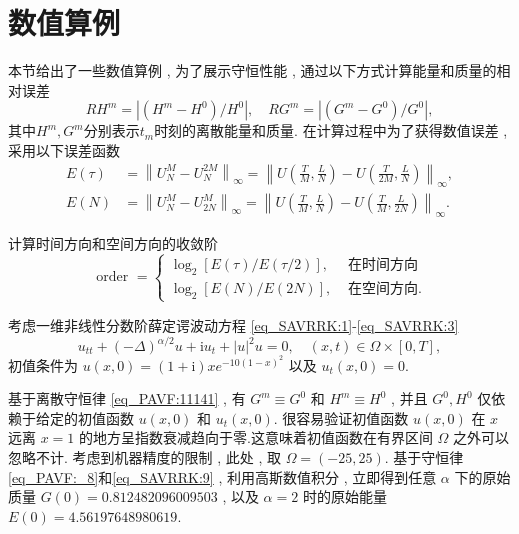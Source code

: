 \section{数值算例}\label{Section_PAVF: 4}

本节给出了一些数值算例 , 为了展示守恒性能 , 通过以下方式计算能量和质量的相对误差
\begin{equation}\label{eq_PAVF:105}
R H^{m}=\left|\left(H^{m}-H^{0}\right) / H^{0}\right| , \quad R G^{m}=\left|\left(G^{m}-G^{0}\right) / G^{0}\right| , 
\end{equation}
其中$H^{m} , G^{m}$分别表示$t_{m}$时刻的离散能量和质量.
在计算过程中为了获得数值误差 , 采用以下误差函数
\begin{align}\label{eq_PAVF:103}
E(\tau)&=\left\|U_{N}^{M}-U_{N}^{2 M}\right\|_{\infty}=\left\|U\left(\frac{T}{M} , \frac{L}{N}\right)-U\left(\frac{T}{2 M} , \frac{L}{N}\right)\right\|_{\infty} , \nonumber\\
E(N)&=\left\|U_{N}^{M}-U_{2 N}^{M}\right\|_{\infty}=\left\|U\left(\frac{T}{M} , \frac{L}{N}\right)-U\left(\frac{T}{M} , \frac{L}{2 N}\right)\right\|_{\infty}.
\end{align}

计算时间方向和空间方向的收敛阶
\begin{equation}
\text { order }= \left\{
\begin{aligned}
\log _{2}[E(\tau) / E(\tau / 2)] , & \text { 在时间方向 } \\
\log _{2}[E(N) / E(2 N)] , & \text { 在空间方向.}
\end{aligned}\right.\label{eq_PAVF:104}
\end{equation}
\begin{example}\label{exp_PAVF:2}
	考虑一维非线性分数阶薛定谔波动方程 \eqref{eq_SAVRRK:1}-\eqref{eq_SAVRRK:3}
	\begin{equation}\label{eq_PAVF:108}
	u_{t t}+(-\Delta)^{\alpha / 2} u+\mathrm{i}u_t+|u|^2 u=0 , \quad (x , t)\in  \Omega\times[0 , T] , 
	\end{equation}
	初值条件为 $u(x , 0)=(1+\mathrm{i}) x e^{-10(1-x)^2}$ 以及 $u_t(x , 0)=0$.
\end{example}

	基于离散守恒律 \eqref{eq_PAVF:11141} , 有 $G^{m}\equiv G^0$ 和 $H^{m}\equiv H^0$ , 并且 $G^0 , H^0$ 仅依赖于给定的初值函数 $u(x , 0)$ 和 $u_t(x , 0)$.
	很容易验证初值函数 $u(x , 0)$ 在 $x$ 远离 $x=1$ 的地方呈指数衰减趋向于零.这意味着初值函数在有界区间 $\Omega$ 之外可以忽略不计.
	考虑到机器精度的限制 , 此处 , 取 $\Omega=(-25 , 25)$.
	基于守恒律 \eqref{eq_PAVF:_8}和\eqref{eq_SAVRRK:9} , 利用高斯数值积分 , 立即得到任意 $\alpha$ 下的原始质量 $G(0)=0.812482096009503$ , 以及 $\alpha=2$ 时的原始能量 $E(0)=4.56197648980619$.

